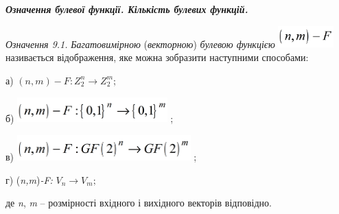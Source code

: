 \documentclass[a4paper]{article}
\newcounter{}
\begin{document}
\bigskip


\bigskip

{\centering\bfseries\itshape
Означення булевої функції.  Кількість булевих функцій. 
\par}


\bigskip


\bigskip

 \textit{Означення 9.1.}\textit{  }\textit{Багатовимірною} (\textit{векторною})
\textit{булевою функцією} 
\includegraphics[width=0.8417in,height=0.3346in]{crypt-img/crypt-img81.png} 
називається відображення, яке можна зобразити наступними способами:

а) ${(n,m)-F:Z_{{2}}^{{n}}\rightarrow Z_{{2}}^{{m}};}$

б)  \includegraphics[width=2.2756in,height=0.3854in]{crypt-img/crypt-img82.png}
;

в)  \includegraphics[width=2.6339in,height=0.3862in]{crypt-img/crypt-img83.png}
; $ $

г)  (\textit{n}\textit{,}\textit{m})\textit{{}-}\textit{F}\textit{:}\textit{ }
${V_{{n}}\rightarrow V_{{m}};}$

де \textit{n}, \textit{m }– розмірності вхідного і вихідного векторів
відповідно. 
\end{document}
